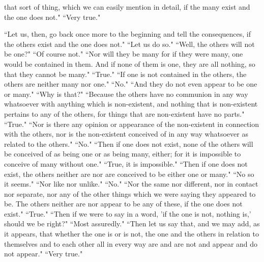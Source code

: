 \documentclass[letterpaper,12pt]{article}
\newcommand{\stephpag}[1]{\marginnote{\small\itshape\fontfamily{ppl}\selectfont #1}}
\begin{document}
that sort of thing, which we can easily mention in detail, \stephpag{e} if the many exist and the one does not." ``Very true."

``Let us, then, go back once more to the beginning and tell the consequences, if the others exist and the one does not." ``Let us do so." ``Well, the others will not be one?" ``Of course not." ``Nor will they be many for if they were many, one would be contained in them. And if none of them is one, they are all nothing, so that they cannot be many." ``True." ``If one is not contained in the others, the others are neither many nor one." \stephpag{166 a} ``No." ``And they do not even appear to be one or many." ``Why is that?" ``Because the others have no communion in any way whatsoever with anything which is non-existent, and nothing that is non-existent pertains to any of the others, for things that are non-existent have no parts." ``True." ``Nor is there any opinion or appearance of the non-existent in connection with the others, nor is the non-existent conceived of in any way whatsoever as related to the others." ``No." ``Then if one does not exist, \stephpag{b} none of the others will be conceived of as being one or as being many, either; for it is impossible to conceive of many without one." ``True, it is impossible." ``Then if one does not exist, the others neither are nor are conceived to be either one or many." ``No so it seems." ``Nor like nor unlike." ``No." ``Nor the same nor different, nor in contact nor separate, nor any of the other things which we were saying they appeared to be. The others neither are nor appear to be any of these, if the one does not exist." \stephpag{c} ``True." ``Then if we were to say in a word, 'if the one is not, nothing is,' should we be right?" ``Most assuredly." ``Then let us say that, and we may add, as it appears, that whether the one is or is not, the one and the others in relation to themselves and to each other all in every way are and are not and appear and do not appear." ``Very true."
\end{document}
